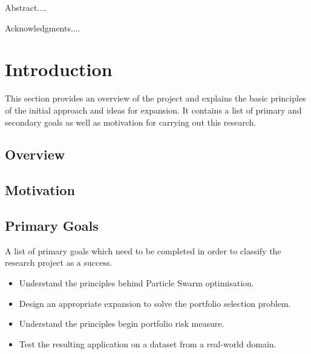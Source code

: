 \documentclass{pdfmx4020}
\begin{document}
\newfrontpage


\begin{Abstract}
Abstract....
\end{Abstract}

\begin{Acknowledgments}
Acknowledgments....
\end{Acknowledgments}

\StartThesis

\listoffigures
\listoftables

\chapter{Introduction}
This section provides an overview of the project and explains the basic principles of the initial approach and ideas for expansion. It contains a list of primary and secondary goals as well as motivation for carrying out this research.

  \section{Overview} %
  \label{sec:overview}
  

  \section{Motivation} %
  \label{sec:motivation}

  \section{Primary Goals} %
  \label{sec:primary_goals}
  A list of primary goals which need to be completed in order to classify the research project as a success.
  \begin{itemize}
    \item Understand the principles behind Particle Swarm optimisation.
    \item Design an appropriate expansion to solve the portfolio selection problem.
    \item Understand the principles begin portfolio risk measure.
    \item Test the resulting application on a dataset from a real-world domain.
  \end{itemize}
\end{document}
